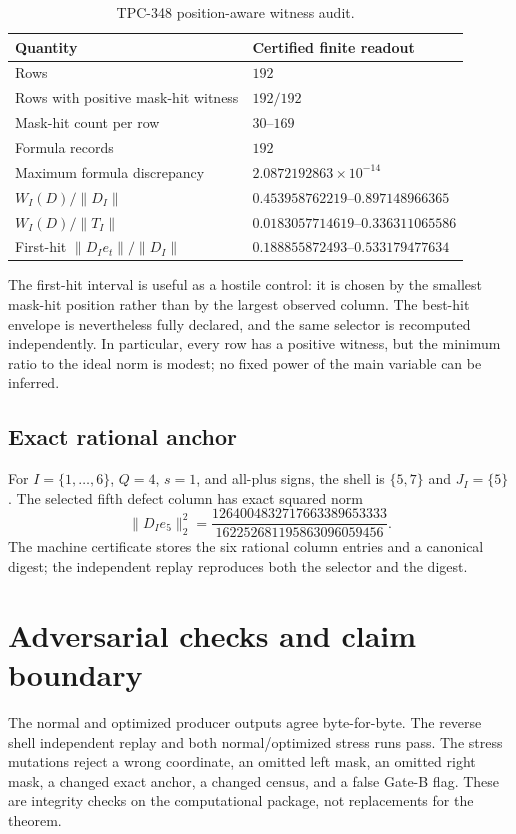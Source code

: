 \documentclass[10pt]{article}
\begin{document}
\begin{table}[t]
\centering
\small
\caption{TPC-348 position-aware witness audit.}
\label{tab:summary}
\begin{tabular}{@{}ll@{}}
\toprule
Quantity & Certified finite readout\\
\midrule
Rows & $192$\\
Rows with positive mask-hit witness & $192/192$\\
Mask-hit count per row & $30$--$169$\\
Formula records & $192$\\
Maximum formula discrepancy & $2.0872192863\times10^{-14}$\\
$W_I(D)/\|D_I\|$ & $0.453958762219$--$0.897148966365$\\
$W_I(D)/\|T_I\|$ & $0.0183057714619$--$0.336311065586$\\
First-hit $\|D_Ie_t\|/\|D_I\|$ & $0.188855872493$--$0.533179477634$\\
\bottomrule
\end{tabular}
\end{table}

The first-hit interval is useful as a hostile control: it is chosen by the
smallest mask-hit position rather than by the largest observed column.  The
best-hit envelope is nevertheless fully declared, and the same selector is
recomputed independently.  In particular, every row has a positive witness,
but the minimum ratio to the ideal norm is modest; no fixed power of the main
variable can be inferred.

\subsection{Exact rational anchor}

For $I=\{1,\ldots,6\}$, $Q=4$, $s=1$, and all-plus signs, the shell is
$\{5,7\}$ and $J_I=\{5\}$.  The selected fifth defect column has exact
squared norm
\[
 \|D_Ie_5\|_2^2=
 \frac{1264004832717663389653333}
 {162252681195863096059456}.
\]
The machine certificate stores the six rational column entries and a canonical
digest; the independent replay reproduces both the selector and the digest.

\section{Adversarial checks and claim boundary}

The normal and optimized producer outputs agree byte-for-byte.  The reverse
shell independent replay and both normal/optimized stress runs pass.  The
stress mutations reject a wrong coordinate, an omitted left mask, an omitted
right mask, a changed exact anchor, a changed census, and a false Gate-B flag.
These are integrity checks on the computational package, not replacements for
the theorem.
\end{document}
